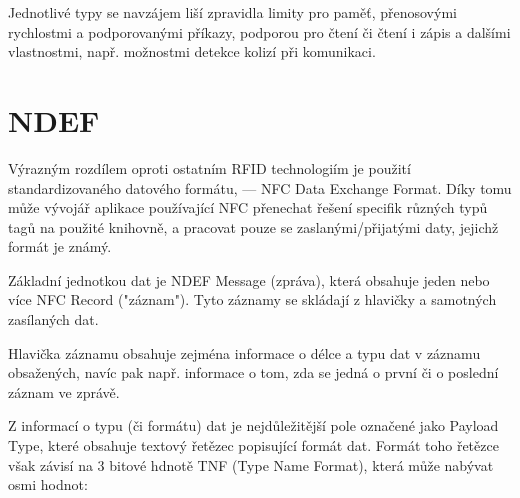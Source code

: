     Jednotlivé typy se navzájem liší zpravidla limity pro paměť, přenosovými 
    rychlostmi a podporovanými příkazy, podporou pro čtení či čtení i zápis a 
    dalšími vlastnostmi, např. možnostmi detekce kolizí při komunikaci.

\section{NDEF}


    Výrazným rozdílem oproti ostatním RFID technologiím je použití 
    standardizovaného datového formátu, --- NFC Data Exchange Format. Díky tomu
    může vývojář aplikace používající NFC přenechat řešení specifik různých
    typů tagů na použité knihovně, a pracovat pouze se zaslanými/přijatými daty,
    jejichž formát je známý.
    
    Základní jednotkou dat je NDEF Message (zpráva), která
    obsahuje jeden nebo více NFC Record ("záznam"). Tyto záznamy se skládají z
    hlavičky a samotných zasílaných dat.

    Hlavička záznamu obsahuje zejména informace o délce a typu dat v záznamu
    obsažených, navíc pak např. informace o tom, zda se jedná o první či o
    poslední záznam ve zprávě. 

    Z informací o typu (či formátu) dat je nejdůležitější pole označené jako 
    Payload Type, které obsahuje textový řetězec popisující formát dat. 
    Formát toho řetězce však závisí na 3 bitové hdnotě TNF 
    (Type Name Format), která může nabývat osmi hodnot:
    
